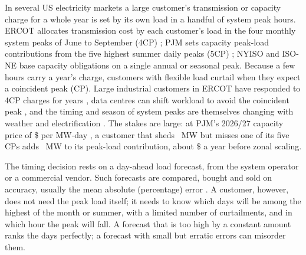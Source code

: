 \documentclass[preprint,12pt,authoryear]{elsarticle}
\begin{document}
In several US electricity markets a large customer's transmission or capacity charge for a whole year is set by its own load in a handful of system peak hours. ERCOT allocates transmission cost by each customer's load in the four monthly system peaks of June to September (4CP) \citep{puct25192}; PJM sets capacity peak-load contributions from the five highest summer daily peaks (5CP) \citep{pjm_m19}; NYISO and ISO-NE base capacity obligations on a single annual or seasonal peak. Because a few hours carry a year's charge, customers with flexible load curtail when they expect a coincident peak (CP). Large industrial customers in ERCOT have responded to 4CP charges for years \citep{zarnikau2013response}, data centres can shift workload to avoid the coincident peak \citep{liu2013datacenter}, and the timing and season of system peaks are themselves changing with weather and electrification \citep{skiles2023peak}. The stakes are large: at PJM's 2026/27 capacity price of \$ per MW-day \citep{pjm2025bra}, a customer that sheds ~MW but misses one of its five CPs adds ~MW to its peak-load contribution, about \$ a year before zonal scaling.

The timing decision rests on a day-ahead load forecast, from the system operator or a commercial vendor. Such forecasts are compared, bought and sold on accuracy, usually the mean absolute (percentage) error \citep{hyndman2006another,hong2016probabilistic}. A customer, however, does not need the peak load itself; it needs to know which days will be among the highest of the month or summer, with a limited number of curtailments, and in which hour the peak will fall. A forecast that is too high by a constant amount ranks the days perfectly; a forecast with small but erratic errors can misorder them.
\end{document}
